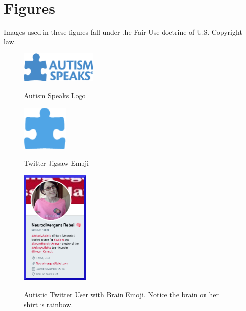\section{Figures}
\label{apx:figures}

Images used in these figures fall under the Fair Use doctrine of U.S. Copyright law.

\begin{figure}[ht]
\caption{Autism Speaks Logo}
\centering
\includegraphics[width=0.333\textwidth]{aspeaks}
\label{fig:aspeaks}
\end{figure}

\begin{figure}[ht]
\caption{Twitter Jigsaw Emoji}
\centering
\includegraphics[width=0.2\textwidth]{twitterJigsaw}
\label{fig:twitterJigsaw}
\end{figure}

\begin{figure}[ht]
\caption[Twitter User with Brain Emoji]{Autistic Twitter User with Brain Emoji. Notice the brain on her shirt is rainbow.}
\centering
\includegraphics[width=0.3\textwidth]{rebel.png}
\label{fig:rebel}
\end{figure}


